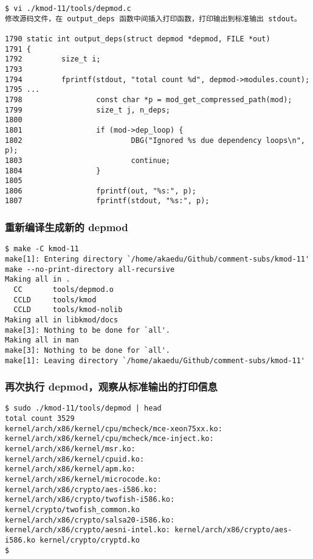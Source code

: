 \documentclass[11pt,a4paper]{article}
\begin{document}
{\begin{shaded}\begin{verbatim}
$ vi ./kmod-11/tools/depmod.c
修改源码文件，在 output_deps 函数中间插入打印函数，打印输出到标准输出 stdout。

1790 static int output_deps(struct depmod *depmod, FILE *out)
1791 {
1792         size_t i;
1793 
1794         fprintf(stdout, "total count %d", depmod->modules.count);
1795 ...
1798                 const char *p = mod_get_compressed_path(mod);
1799                 size_t j, n_deps;
1800 
1801                 if (mod->dep_loop) {
1802                         DBG("Ignored %s due dependency loops\n", p);
1803                         continue;
1804                 }
1805 
1806                 fprintf(out, "%s:", p);
1807                 fprintf(stdout, "%s:", p);
\end{verbatim}\end{shaded}}
\subsubsection{重新编译生成新的 depmod}

{\begin{shaded}\begin{verbatim}
$ make -C kmod-11
make[1]: Entering directory `/home/akaedu/Github/comment-subs/kmod-11'
make --no-print-directory all-recursive
Making all in .
  CC       tools/depmod.o
  CCLD     tools/kmod
  CCLD     tools/kmod-nolib
Making all in libkmod/docs
make[3]: Nothing to be done for `all'.
Making all in man
make[3]: Nothing to be done for `all'.
make[1]: Leaving directory `/home/akaedu/Github/comment-subs/kmod-11'
\end{verbatim}\end{shaded}}
\subsubsection{再次执行 depmod，观察从标准输出的打印信息}

{\begin{shaded}\begin{verbatim}
$ sudo ./kmod-11/tools/depmod | head
total count 3529
kernel/arch/x86/kernel/cpu/mcheck/mce-xeon75xx.ko:
kernel/arch/x86/kernel/cpu/mcheck/mce-inject.ko:
kernel/arch/x86/kernel/msr.ko:
kernel/arch/x86/kernel/cpuid.ko:
kernel/arch/x86/kernel/apm.ko:
kernel/arch/x86/kernel/microcode.ko:
kernel/arch/x86/crypto/aes-i586.ko:
kernel/arch/x86/crypto/twofish-i586.ko: kernel/crypto/twofish_common.ko
kernel/arch/x86/crypto/salsa20-i586.ko:
kernel/arch/x86/crypto/aesni-intel.ko: kernel/arch/x86/crypto/aes-i586.ko kernel/crypto/cryptd.ko
$ 
\end{verbatim}\end{shaded}}
\end{document}
